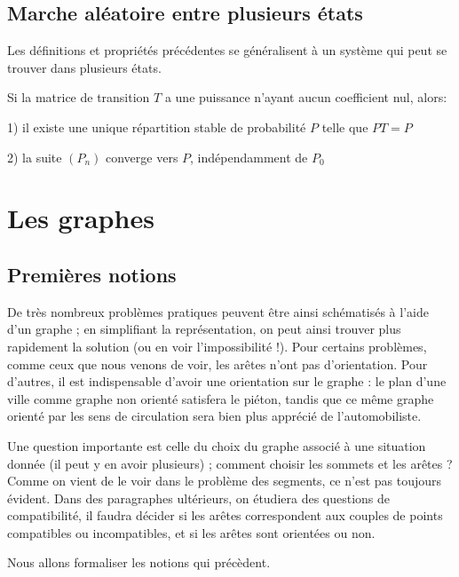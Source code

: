 \documentclass[french]{book}
\begin{document}
\section{Marche aléatoire entre plusieurs états}
 
  Les définitions et propriétés précédentes se généralisent à un système qui peut se trouver dans plusieurs états.
  
\begin{thm}
 
 Si la matrice de transition $T$ a une puissance n'ayant aucun coefficient nul, alors:
 
 1) il existe une unique répartition stable de probabilité $P$ telle que $PT=P$
   
      
   2) la suite $(P_{n})$ converge vers $P$, indépendamment   de $P_{0}$ \end{thm}


\chapter{Les graphes}
\section{Premi\`eres notions}

De très nombreux problèmes pratiques peuvent être ainsi schématisés à l'aide d'un graphe ; en simplifiant la représentation, on peut ainsi trouver plus rapidement la solution (ou en voir
l'impossibilité !). Pour certains problèmes, comme ceux que nous venons de voir, les arêtes n'ont pas d'orientation. Pour d'autres, il est indispensable d'avoir une orientation sur le graphe : le plan d'une ville comme graphe non orienté satisfera le piéton, tandis que ce même graphe orienté par les sens de circulation sera bien plus apprécié de l'automobiliste.

Une question importante est celle du choix du graphe associé à une situation donnée (il peut
y en avoir plusieurs) ; comment choisir les sommets et les arêtes ? Comme on vient de le voir
dans le problème des segments, ce n'est pas toujours évident. Dans des paragraphes ultérieurs, on étudiera des questions de compatibilité, il faudra décider si les arêtes correspondent aux couples de points compatibles ou incompatibles, et si les arêtes sont orientées ou non.

Nous allons formaliser les notions qui précèdent.

\end{document}

